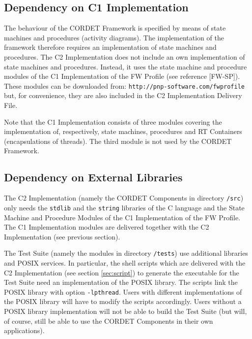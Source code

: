 \documentclass{pnp_article}
\begin{document}
\subsection{Dependency on C1 Implementation}\label{sec:depC1}
The behaviour of the CORDET Framework is specified by means of state machines and procedures (activity diagrams). The implementation of the framework therefore requires an implementation of state machines and procedures. The C2 Implementation does not include an own implementation of state machines and procedures. Instead, it uses the state machine and procedure modules of the C1 Implementation of the FW Profile (see reference [FW-SP]). These modules can be downloaded from: \texttt{http://pnp-software.com/fwprofile} but, for convenience, they are also included in the C2 Implementation Delivery File.

Note that the C1 Implementation consists of three modules covering the implementation of, respectively, state machines, procedures and RT Containers (encapsulations of threads). The third module is not used by the CORDET Framework.

\subsection{Dependency on External Libraries}
The C2 Implementation (namely the CORDET Components in directory \texttt{/src}) only needs the \texttt{stdlib} and the \texttt{string} libraries of the C language and the State Machine and Procedure Modules of the C1 Implementation of the FW Profile. The C1 Implementation modules are delivered together with the C2 Implementation (see previous section). 

The Test Suite (namely the modules in directory \texttt{/tests}) use additional libraries and POSIX services. In particular, the shell scripts which are delivered with the C2 Implementation (see section \ref{sec:script}) to generate the executable for the Test Suite need an implementation of the POSIX library. The scripts link the POSIX library with option \texttt{-lpthread}. Users with different implementations of the POSIX library will have to modify the scripts accordingly. Users without a POSIX library implementation will not be able to build the Test Suite (but will, of course, still be able to use the CORDET Components in their own applications).
\end{document}
